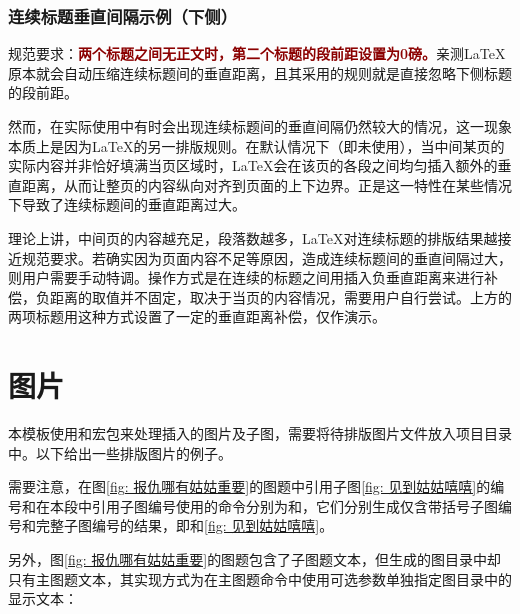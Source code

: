 \documentclass[doctor, vlined, ]{DissertUESTC}
\begin{document}
	\subsubsection{连续标题垂直间隔示例（下侧）}

	规范要求：\textbf{\textcolor{DarkRed}{两个标题之间无正文时，第二个标题的段前距设置为0磅。}}亲测LaTeX原本就会自动压缩连续标题间的垂直距离，且其采用的规则就是直接忽略下侧标题的段前距。
	
	然而，在实际使用中有时会出现连续标题间的垂直间隔仍然较大的情况，这一现象本质上是因为LaTeX的另一排版规则。在默认情况下（即未使用），当中间某页的实际内容并非恰好填满当页区域时，LaTeX会在该页的各段之间均匀插入额外的垂直距离，从而让整页的内容纵向对齐到页面的上下边界。正是这一特性在某些情况下导致了连续标题间的垂直距离过大。

	理论上讲，中间页的内容越充足，段落数越多，LaTeX对连续标题的排版结果越接近规范要求。若确实因为页面内容不足等原因，造成连续标题间的垂直间隔过大，则用户需要手动特调。操作方式是在连续的标题之间用插入负垂直距离来进行补偿，负距离的取值并不固定，取决于当页的内容情况，需要用户自行尝试。上方的两项标题用这种方式设置了一定的垂直距离补偿，仅作演示。
	
	\section{图片}
	
	本模板使用\href{https://mirror.nyist.edu.cn/CTAN/macros/latex/required/graphics/grfguide.pdf}{\ttfamily\color{DarkRed}}和\href{https://mirrors.bfsu.edu.cn/CTAN/macros/latex/contrib/subfig/subfig.pdf}{\ttfamily\color{DarkRed}}宏包来处理插入的图片及子图，需要将待排版图片文件放入项目目录中。以下给出一些排版图片的例子。
	
	需要注意，在图\ref{fig: 报仇哪有姑姑重要}的图题中引用子图\ref{fig: 见到姑姑嘻嘻}的编号和在本段中引用子图编号使用的命令分别为和，它们分别生成仅含带括号子图编号和完整子图编号的结果，即和\ref{fig: 见到姑姑嘻嘻}。
	
	另外，图\ref{fig: 报仇哪有姑姑重要}的图题包含了子图题文本，但生成的图目录中却只有主图题文本，其实现方式为在主图题命令中使用可选参数单独指定图目录中的显示文本：
\end{document}
